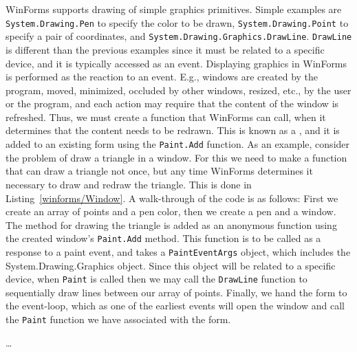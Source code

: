 WinForms supports drawing of simple graphics primitives. Simple examples are \lstinline!System.Drawing.Pen! to specify the color to be drawn, \lstinline!System.Drawing.Point! to specify a pair of coordinates, and \lstinline!System.Drawing.Graphics.DrawLine!. \lstinline!DrawLine! is different than the previous examples since it must be related to a specific device, and it is typically accessed as an event. Displaying graphics in WinForms is performed as the reaction to an event. E.g., windows are created by the program, moved, minimized, occluded by other windows, resized, etc., by the user or the program, and each action may require that the content of the window is refreshed. Thus, we must create a function that WinForms can call, when it determines that the content needs to be redrawn. This is known as a , and it is added to an existing form using the \lstinline!Paint.Add! function. As an example, consider the problem of draw a triangle in a window. For this we need to make a function that can draw a triangle not once, but any time WinForms determines it necessary to draw and redraw the triangle. This is done in Listing~\ref{winforms/Window}.
%
%
A walk-through of the code is as follows: First we create an array of points and a pen color, then we create a pen and a window. The method for drawing the triangle is added as an anonymous function using the created window's \lstinline!Paint.Add! method. This function is to be called as a response to a paint event, and takes a \lstinline!PaintEventArgs! object, which includes the System.Drawing.Graphics object. Since this object will be related to a specific device, when \lstinline!Paint! is called then we may call the \lstinline!DrawLine! function to sequentially draw lines between our array of points. Finally, we hand the form to the event-loop, which as one of the earliest events will open the window and call the \lstinline!Paint! function we have associated with the form.

 \dots

